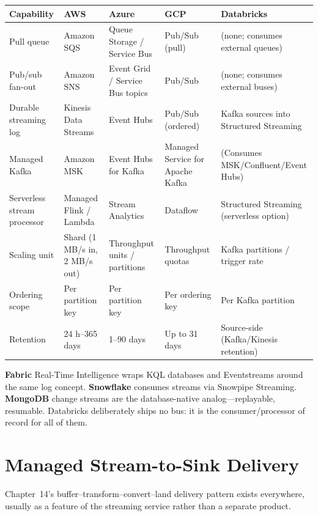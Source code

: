 \begin{center}
\footnotesize
\begin{tabular}{@{}p{2.4cm}p{2.9cm}p{2.9cm}p{2.9cm}p{2.9cm}@{}}
\toprule
\textbf{Capability} & \textbf{AWS} & \textbf{Azure} & \textbf{GCP} & \textbf{Databricks} \\
\midrule
Pull queue & Amazon SQS & Queue Storage / Service Bus & Pub/Sub (pull) & (none; consumes external queues) \\
Pub/sub fan-out & Amazon SNS & Event Grid / Service Bus topics & Pub/Sub & (none; consumes external buses) \\
Durable streaming log & Kinesis Data Streams & Event Hubs & Pub/Sub (ordered) & Kafka sources into Structured Streaming \\
Managed Kafka & Amazon MSK & Event Hubs for Kafka & Managed Service for Apache Kafka & (Consumes MSK/Confluent/Event Hubs) \\
Serverless stream processor & Managed Flink / Lambda & Stream Analytics & Dataflow & Structured Streaming (serverless option) \\
\addlinespace
Scaling unit & Shard (1 MB/s in, 2 MB/s out) & Throughput units / partitions & Throughput quotas & Kafka partitions / trigger rate \\
Ordering scope & Per partition key & Per partition key & Per ordering key & Per Kafka partition \\
Retention & 24 h--365 days & 1--90 days & Up to 31 days & Source-side (Kafka/Kinesis retention) \\
\bottomrule
\end{tabular}
\end{center}

\noindent \textbf{Fabric} Real-Time Intelligence wraps KQL databases and Eventstreams around the
same log concept. \textbf{Snowflake} consumes streams via Snowpipe Streaming. \textbf{MongoDB}
change streams are the database-native analog---replayable, resumable. Databricks deliberately
ships no bus: it is the consumer/processor of record for all of them.

\section{Managed Stream-to-Sink Delivery}
%
Chapter~14's buffer--transform--convert--land delivery pattern exists everywhere, usually as a
feature of the streaming service rather than a separate product.

